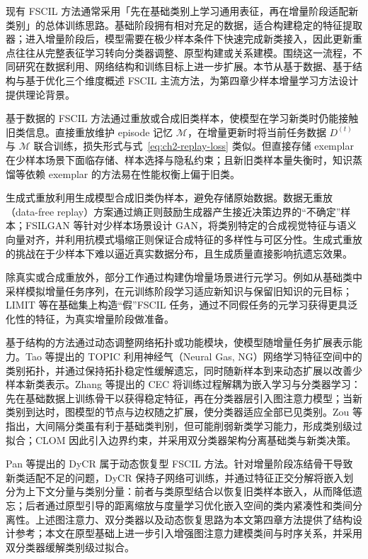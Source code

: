 现有 FSCIL 方法通常采用「先在基础类别上学习通用表征，再在增量阶段适配新类别」的总体训练思路。基础阶段拥有相对充足的数据，适合构建稳定的特征提取器；进入增量阶段后，模型需要在极少样本条件下快速完成新类接入，因此更新重点往往从完整表征学习转向分类器调整、原型构建或关系建模。围绕这一流程，不同研究在数据利用、网络结构和训练目标上进一步扩展\cite{tian2024fscilsurvey}。本节从基于数据、基于结构与基于优化三个维度概述 FSCIL 主流方法，为第四章少样本增量学习方法设计提供理论背景。


基于数据的 FSCIL 方法通过重放或合成旧类样本，使模型在学习新类时仍能接触旧类信息。直接重放维护 episode 记忆 $\mathcal{M}$，在增量更新时将当前任务数据 $D^{(t)}$ 与 $\mathcal{M}$ 联合训练，损失形式与式~\eqref{eq:ch2-replay-loss} 类似。但直接存储 exemplar 在少样本场景下面临存储、样本选择与隐私约束；且新旧类样本量失衡时，知识蒸馏等依赖 exemplar 的方法易在性能权衡上偏于旧类\cite{tian2024fscilsurvey}。

生成式重放利用生成模型合成旧类伪样本，避免存储原始数据。数据无重放（data-free replay）方案通过熵正则鼓励生成器产生接近决策边界的“不确定”样本；FSILGAN 等针对少样本场景设计 GAN，将类别特定的合成视觉特征与语义向量对齐，并利用抗模式塌缩正则保证合成特征的多样性与可区分性。生成式重放的挑战在于少样本下难以逼近真实数据分布，且生成质量直接影响抗遗忘效果\cite{tian2024fscilsurvey}。

除真实或合成重放外，部分工作通过构建伪增量场景进行元学习。例如从基础类中采样模拟增量任务序列，在元训练阶段学习适应新知识与保留旧知识的元目标；LIMIT\cite{zhou2022limit} 等在基础集上构造“假”FSCIL 任务，通过不同假任务的元学习获得更具泛化性的特征，为真实增量阶段做准备\cite{tian2024fscilsurvey}。


基于结构的方法通过动态调整网络拓扑或功能模块，使模型随增量任务扩展表示能力。Tao 等提出的 TOPIC\cite{tao2020topic} 利用神经气（Neural Gas, NG）网络学习特征空间中的类别拓扑，并通过保持拓扑稳定性缓解遗忘，同时随新样本到来动态扩展以改善少样本新类表示。Zhang 等提出的 CEC\cite{zhang2021cec} 将训练过程解耦为嵌入学习与分类器学习：先在基础数据上训练骨干以获得稳定特征，再在分类器层引入图注意力模型；当新类别到达时，图模型的节点与边权随之扩展，使分类器适应全部已见类别。Zou 等指出，大间隔分类虽有利于基础类判别，但可能削弱新类学习能力，形成类别级过拟合；CLOM\cite{zou2022clom} 因此引入边界约束，并采用双分类器架构分离基础类与新类决策。

Pan 等提出的 DyCR\cite{pan2025dycr} 属于动态恢复型 FSCIL 方法。针对增量阶段冻结骨干导致新类适配不足的问题，DyCR 保持子网络可训练，并通过特征正交分解将嵌入划分为上下文分量与类别分量：前者与类原型结合以恢复旧类样本嵌入，从而降低遗忘；后者通过原型引导的距离缩放与度量学习优化嵌入空间的类内紧凑性和类间分离性。上述图注意力、双分类器以及动态恢复思路为本文第四章方法提供了结构设计参考；本文在原型基础上进一步引入增强图注意力建模类间与时序关系，并采用双分类器缓解类别级过拟合。

